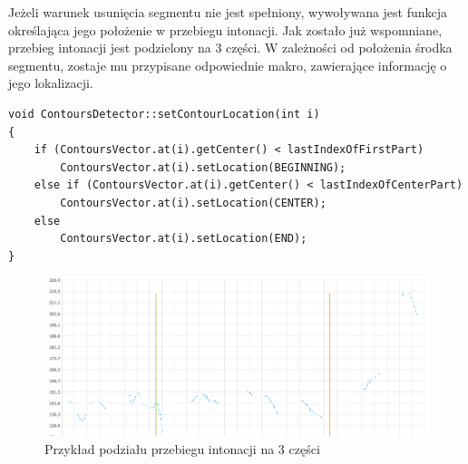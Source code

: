 \documentclass[a4paper,12 pt]{article}
\begin{document}
Jeżeli warunek usunięcia segmentu nie jest spełniony, wywoływana jest funkcja określająca jego położenie w przebiegu intonacji. Jak zostało już wspomniane, przebieg intonacji jest podzielony na 3 części. W zależności od położenia środka segmentu, zostaje mu przypisane odpowiednie makro, zawierające informację o jego lokalizacji.
\begin{lstlisting}
void ContoursDetector::setContourLocation(int i)
{
    if (ContoursVector.at(i).getCenter() < lastIndexOfFirstPart)
        ContoursVector.at(i).setLocation(BEGINNING);
    else if (ContoursVector.at(i).getCenter() < lastIndexOfCenterPart)
        ContoursVector.at(i).setLocation(CENTER);
    else
        ContoursVector.at(i).setLocation(END);
}
\end{lstlisting}
 \FloatBarrier
\begin{figure}[h]
\centering
\includegraphics[scale=0.7]{podzial_wykresu.png}
\caption{Przykład podziału przebiegu intonacji na 3 części}
\end{figure}
\FloatBarrier
\end{document}
